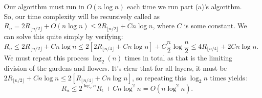 \documentclass{article}
\begin{document}
\begin{solution}
\begin{enumerate}[label = (\alph*)]
Our algorithm must run in $O(n \log n)$ each time we run part (a)'s algorithm. So, our time complexity will be recursively called as $R_n = 2R_{\lfloor n/2 \rfloor} + O(n \log n) \leq 2R_{\lfloor n/2 \rfloor} + Cn \log n$, where $C$ is some constant. We can solve this quite simply by verifying:$$R_n  \leq  2R_{\lfloor n/2 \rfloor} + Cn \log n\leq  2\left[ 2R_{\lfloor n/4 \rfloor} + Cn \log n\right] + C\dfrac{n}{2} \log \dfrac{n}{2} \leq 4R_{\lfloor n/4 \rfloor} + 2Cn\log n.$$ We must repeat this process $\log_2 (n)$ times in total as that is the limiting division of the gardens and flowers. It's clear that for all layers, it must be $2R_{\lfloor n/2 \rfloor} + Cn \log n \leq 2 \left[R_{\lfloor n/4 \rfloor} + Cn\log n\right]$, so repeating this $\log_2 n$ times yields: $$R_n \leq 2^{\log_2n}R_1 + Cn\log^2 n = O(n \log^2 n).$$
\end{enumerate}
\end{solution}
\end{document}
